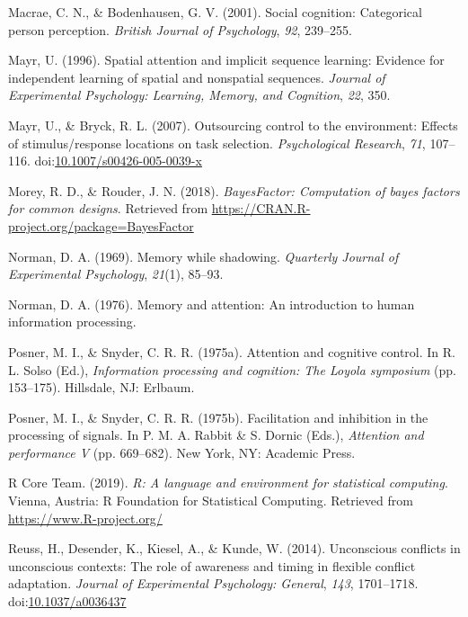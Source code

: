 \documentclass[english,,man,floatsintext]{apa6}
\begin{document}
\leavevmode\hypertarget{ref-macrae_social_2001}{}%
Macrae, C. N., \& Bodenhausen, G. V. (2001). Social cognition: Categorical person perception. \emph{British Journal of Psychology}, \emph{92}, 239--255.

\leavevmode\hypertarget{ref-mayr_spatial_1996}{}%
Mayr, U. (1996). Spatial attention and implicit sequence learning: Evidence for independent learning of spatial and nonspatial sequences. \emph{Journal of Experimental Psychology: Learning, Memory, and Cognition}, \emph{22}, 350.

\leavevmode\hypertarget{ref-mayr_outsourcing_2007}{}%
Mayr, U., \& Bryck, R. L. (2007). Outsourcing control to the environment: Effects of stimulus/response locations on task selection. \emph{Psychological Research}, \emph{71}, 107--116. doi:\href{https://doi.org/10.1007/s00426-005-0039-x}{10.1007/s00426-005-0039-x}

\leavevmode\hypertarget{ref-r_bayesfactor_2018}{}%
Morey, R. D., \& Rouder, J. N. (2018). \emph{BayesFactor: Computation of bayes factors for common designs}. Retrieved from \url{https://CRAN.R-project.org/package=BayesFactor}

\leavevmode\hypertarget{ref-norman_memory_1969}{}%
Norman, D. A. (1969). Memory while shadowing. \emph{Quarterly Journal of Experimental Psychology}, \emph{21}(1), 85--93.

\leavevmode\hypertarget{ref-norman_memory_1976}{}%
Norman, D. A. (1976). Memory and attention: An introduction to human information processing.

\leavevmode\hypertarget{ref-posner_attention_1975}{}%
Posner, M. I., \& Snyder, C. R. R. (1975a). Attention and cognitive control. In R. L. Solso (Ed.), \emph{Information processing and cognition: The Loyola symposium} (pp. 153--175). Hillsdale, NJ: Erlbaum.

\leavevmode\hypertarget{ref-posner_facilitation_1975}{}%
Posner, M. I., \& Snyder, C. R. R. (1975b). Facilitation and inhibition in the processing of signals. In P. M. A. Rabbit \& S. Dornic (Eds.), \emph{Attention and performance V} (pp. 669--682). New York, NY: Academic Press.

\leavevmode\hypertarget{ref-r_software_2019}{}%
R Core Team. (2019). \emph{R: A language and environment for statistical computing}. Vienna, Austria: R Foundation for Statistical Computing. Retrieved from \url{https://www.R-project.org/}

\leavevmode\hypertarget{ref-reuss_unconscious_2014}{}%
Reuss, H., Desender, K., Kiesel, A., \& Kunde, W. (2014). Unconscious conflicts in unconscious contexts: The role of awareness and timing in flexible conflict adaptation. \emph{Journal of Experimental Psychology: General}, \emph{143}, 1701--1718. doi:\href{https://doi.org/10.1037/a0036437}{10.1037/a0036437}
\end{document}
